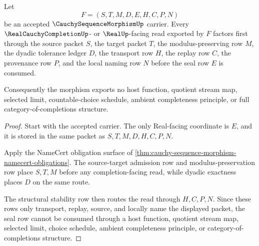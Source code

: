 \begin{theorem}
\label{thm:cauchy-sequence-morphism-real-seal-nonescape}
Let
$$
F=(S,T,M,D,E,H,C,P,N)
$$
be an accepted $\CauchySequenceMorphismUp$ carrier. Every $\RealCauchyCompletionUp$- or $\RealUp$-facing read exported by $F$ factors first through the source packet $S$, the target packet $T$, the modulus-preserving row $M$, the dyadic tolerance ledger $D$, the transport row $H$, the replay row $C$, the provenance row $P$, and the local naming row $N$ before the seal row $E$ is consumed.

Consequently the morphism exports no host function, quotient stream map, selected limit, countable-choice schedule, ambient completeness principle, or full category-of-completions structure.
\end{theorem}
\begin{proof}
Start with the accepted carrier. The only Real-facing coordinate is $E$, and it is stored in the same packet as $S,T,M,D,H,C,P,N$.

Apply the NameCert obligation surface of \autoref{thm:cauchy-sequence-morphism-namecert-obligations}. The source-target admission row and modulus-preservation row place $S,T,M$ before any completion-facing read, while dyadic exactness places $D$ on the same route.

The structural stability row then routes the read through $H,C,P,N$. Since these rows only transport, replay, source, and locally name the displayed packet, the seal row cannot be consumed through a host function, quotient stream map, selected limit, choice schedule, ambient completeness principle, or category-of-completions structure.
\end{proof}


\begin{closurestatus}{\CauchySequenceMorphismUp}
  \theoryclosure{\seedClosure}
  \formalstatus{\unformalizedV}
\end{closurestatus}
